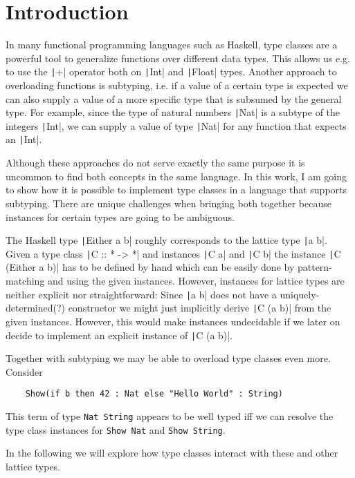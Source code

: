 
\chapter{Introduction}\label{ch:intro}


In many functional programming languages such as Haskell, type classes are a powerful tool to generalize functions over different data types.
This allows us e.g. to use the \texttt|+| operator both on \texttt|Int| and \texttt|Float| types.
Another approach to overloading functions is subtyping, i.e. if a value of a certain type is expected we can also supply a value of a more specific type that is subsumed by the general type.
For example, since the type of natural numbers \texttt|Nat| is a subtype of the integers \texttt|Int|, we can supply a value of type \texttt|Nat| for any function that expects an \texttt|Int|.

Although these approaches do not serve exactly the same purpose it is uncommon to find both concepts in the same language.
In this work, I am going to show how it is possible to implement type classes in a language that supports subtyping.
There are unique challenges when bringing both together because instances for certain types are going to be ambiguous.

The Haskell type \texttt|Either a b| roughly corresponds to the lattice type \texttt|a \/ b|.
Given a type class \texttt|C :: * -> *| and instances \texttt|C a| and \texttt|C b| the instance \texttt|C (Either a b)| has to be defined by hand which can be easily done by pattern-matching and using the given instances.
However, instances for lattice types are neither explicit nor straightforward:
Since \texttt|a \/ b| does not have a uniquely-determined(?) constructor we might just implicitly derive \texttt|C (a \/ b)| from the given instances.
However, this would make instances undecidable if we later on decide to implement an explicit instance of \texttt|C (a \/ b)|.

Together with subtyping we may be able to overload type classes even more.
Consider
\begin{verbatim}
    Show(if b then 42 : Nat else "Hello World" : String)
\end{verbatim}
This term of type \texttt{Nat \/ String} appears to be well typed iff we can resolve the type class instances for \texttt{Show Nat} and \texttt{Show String}.

In the following we will explore how type classes interact with these and other lattice types.

